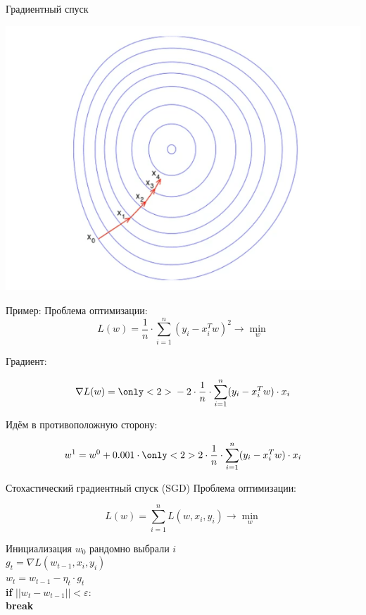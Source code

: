 \documentclass[notes,12pt, aspectratio=169]{beamer}
\newcommand{\pgr}[1]{{\color{green} \textbf{#1}}}
\begin{document}
\begin{frame}{Градиентный спуск}
\begin{center}
	\includegraphics[width=.6\linewidth]{2dgrad.png}
\end{center}
\end{frame}


\begin{frame}[fragile]{Пример:}
Проблема оптимизации: 
\[   
L(w) = \frac{1}{n} \cdot \sum_{i=1}^n  (y_i - x_i^T w)^2 \to \min_{w}
\]

Градиент: 

\[   
\nabla L(w) =   { \only<2>{ \color{red}} -2 \cdot   \frac{1}{n} \cdot \sum_{i=1}^n (y_i - x_i^T w)\cdot x_i }
\]

Идём в противоположную сторону: 

\[
w^1 =   w^0  +  0.001 \cdot  { \only<2>{ \color{red}}  2 \cdot \frac{1}{n} \cdot \sum_{i=1}^n (y_i - x_i^T w)\cdot x_i } 
\]

\end{frame}


\begin{frame}[fragile]{Стохастический градиентный спуск (SGD)}
Проблема оптимизации: 

\[   
L(w) = \sum_{i=1}^n L(w, x_i, y_i) \to \min_{w}
\]

Инициализация $w_0$ 
\hspace{15pt} рандомно выбрали $i$ \\
\pgr{\hspace{15pt}} $g_t = \nabla L(w_{t-1}, x_i, y_i)$ \\
\pgr{\hspace{15pt}} $w_t = w _{t-1} - \eta_t \cdot g_t  $ \\
\pgr{\hspace{15pt} if} $||w_t - w_{t-1}|| < \varepsilon:$ \\
\pgr{\hspace{30pt} break}
\end{frame}
\end{document}
